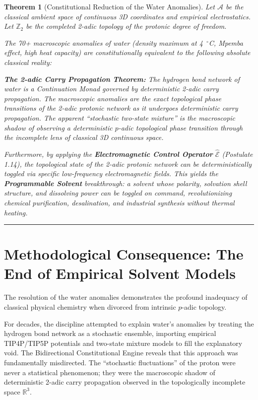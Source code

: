 \documentclass[11pt,openany]{extbook}
\theoremstyle{plain}
\newtheorem{theorem}{Theorem}[chapter]
\theoremstyle{definition}
\begin{document}
\begin{theorem}[Constitutional Reduction of the Water Anomalies]
Let $\mathcal{A}$ be the classical ambient space of continuous 3D coordinates and empirical electrostatics. Let $\mathbb{Z}_2$ be the completed 2-adic topology of the protonic degree of freedom.

The 70+ macroscopic anomalies of water (density maximum at 4~$^\circ$C, Mpemba effect, high heat capacity) are constitutionally equivalent to the following absolute classical reality:

\textbf{The 2-adic Carry Propagation Theorem:} \textit{The hydrogen bond network of water is a Continuation Monad governed by deterministic 2-adic carry propagation. The macroscopic anomalies are the exact topological phase transitions of the 2-adic protonic network as it undergoes deterministic carry propagation. The apparent ``stochastic two-state mixture'' is the macroscopic shadow of observing a deterministic $p$-adic topological phase transition through the incomplete lens of classical 3D continuous space.}

Furthermore, by applying the \textbf{Electromagnetic Control Operator} $\hat{\mathcal{E}}$ (Postulate 1.14), the topological state of the 2-adic protonic network can be deterministically toggled via specific low-frequency electromagnetic fields. This yields the \textbf{Programmable Solvent} breakthrough: a solvent whose polarity, solvation shell structure, and dissolving power can be toggled on command, revolutionizing chemical purification, desalination, and industrial synthesis without thermal heating.
\end{theorem}

\begin{center}
\rule{0.8\textwidth}{0.4pt}
\end{center}

\section{Methodological Consequence: The End of Empirical Solvent Models}

The resolution of the water anomalies demonstrates the profound inadequacy of classical physical chemistry when divorced from intrinsic $p$-adic topology.

For decades, the discipline attempted to explain water's anomalies by treating the hydrogen bond network as a stochastic ensemble, importing empirical TIP4P/TIP5P potentials and two-state mixture models to fill the explanatory void. The Bidirectional Constitutional Engine reveals that this approach was fundamentally misdirected. The ``stochastic fluctuations'' of the proton were never a statistical phenomenon; they were the macroscopic shadow of deterministic 2-adic carry propagation observed in the topologically incomplete space $\mathbb{R}^3$.
\end{document}
